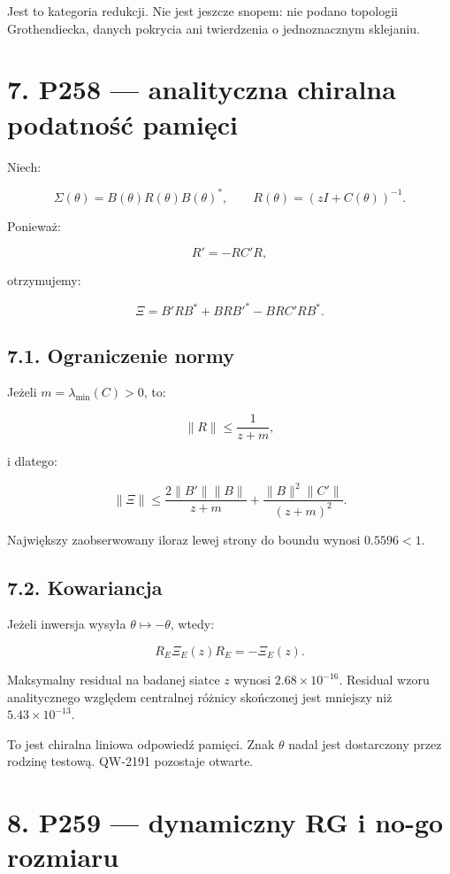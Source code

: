 \documentclass[11pt,a4paper,openany]{report}
\begin{document}
Jest to kategoria redukcji. Nie jest jeszcze snopem: nie podano topologii Grothendiecka, danych pokrycia ani twierdzenia o jednoznacznym sklejaniu.

\chapter{7. P258 --- analityczna chiralna podatność pamięci}

Niech:

\[
\Sigma(\theta)=B(\theta)R(\theta)B(\theta)^\ast,
\qquad
R(\theta)=(zI+C(\theta))^{-1}.
\]

Poniewa\.z:

\[
R'=-RC'R,
\]

otrzymujemy:

\[
\boxed{
\Xi
=
B'RB^\ast
+BRB'^\ast
-BRC'RB^\ast
}.
\]

\section{7.1. Ograniczenie normy}

Je\.zeli \(m=\lambda_{\min}(C)>0\), to:

\[
\|R\|\leq\frac1{z+m},
\]

i dlatego:

\[
\|\Xi\|
\leq
\frac{2\|B'\|\|B\|}{z+m}
+
\frac{\|B\|^2\|C'\|}{(z+m)^2}.
\]

Największy zaobserwowany iloraz lewej strony do boundu wynosi \(0.5596<1\).

\section{7.2. Kowariancja}

Je\.zeli inwersja wysyła \(\theta\mapsto-\theta\), wtedy:

\[
R_E\Xi_E(z)R_E=-\Xi_E(z).
\]

Maksymalny residual na badanej siatce \(z\) wynosi \(2.68\times10^{-16}\). Residual wzoru analitycznego względem centralnej ró\.znicy skończonej jest mniejszy ni\.z \(5.43\times10^{-13}\).

To jest chiralna liniowa odpowiedź pamięci. Znak \(\theta\) nadal jest dostarczony przez rodzinę testową. QW-2191 pozostaje otwarte.

\chapter{8. P259 --- dynamiczny RG i no-go rozmiaru}
\end{document}
